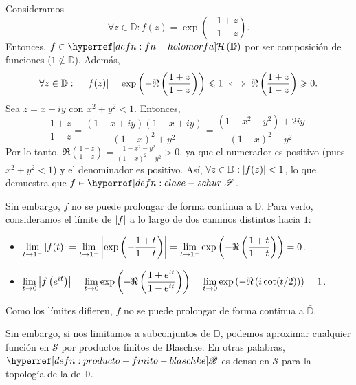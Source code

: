 \begin{ejem}
    Consideramos
    \[
    \forall z \in \mathbb{D} : f(z) = \exp \left(- \frac{1 + z}{1 - z} \right).
    \]
    Entonces, $f \in \exhyperref[defn:fn-holomorfa]{fn-holomorfa}{\mathcal{H}} \left(\mathbb{D}\right)$ por ser composición de funciones  ($1 \notin \mathbb{D}$). Además,
    \[
    \forall z \in \mathbb{D} : \quad \left|f(z)\right| = \exp \left( - \Re \left( \frac{1 + z}{1 - z} \right) \right) \leqslant 1 \iff \Re \left( \frac{1 + z}{1 - z} \right) \geqslant 0.
    \]
    Sea $z = x + iy$ con $x^2 + y^2 < 1$. Entonces,
    \[
    \frac{1 + z}{1 - z} = \frac{(1+x+iy)(1-x+iy)}{(1-x)^2 + y^2} = \frac{(1-x^2-y^2) + 2iy}{(1-x)^2 + y^2}.
    \]
    Por lo tanto, $\Re \left( \frac{1 + z}{1 - z} \right) = \frac{1 - x^2 - y^2}{(1-x)^2 + y^2} > 0$, ya que el numerador es positivo (pues $x^2 + y^2 < 1$) y el denominador es positivo. Así, $\forall z \in \mathbb{D} : \left|f(z)\right| < 1$, lo que demuestra que $f \in \exhyperref[defn:clase-schur]{clase-schur}{\mathscr{S}}$.

    Sin embargo, $f$ no se puede prolongar de forma continua a $\bar{\mathbb{D}}$. Para verlo, consideramos el límite de $\left|f\right|$ a lo largo de dos caminos distintos hacia $1$:
    \begin{itemize}
        \item $\displaystyle \lim_{t \to 1^-} \left|f(t)\right| = \lim_{t \to 1^-} \left|\exp \left( - \frac{1 + t}{1 - t} \right)\right| = \lim_{t \to 1^-} \exp \left( - \Re \left( \frac{1 + t}{1 - t} \right) \right) = 0$.
        \item $\displaystyle \lim_{t \to 0} \left|f \left(e^{it} \right)\right| = \lim_{t \to 0} \exp \left( - \Re \left( \frac{1 + e^{it}}{1 - e^{it}} \right) \right) = \lim_{t \to 0} \exp \left( - \Re \left( i \cot(t/2) \right) \right) = 1$.
    \end{itemize}
    Como los límites difieren, $f$ no se puede prolongar de forma continua a $\bar{\mathbb{D}}$.
\end{ejem}

Sin embargo, si nos limitamos a subconjuntos  de $\mathbb{D}$, podemos aproximar cualquier función en $\mathscr{S}$ por productos finitos de Blaschke. En otras palabras, $\exhyperref[defn:producto-finito-blaschke]{producto-finito-blaschke}{\mathscr{B}}$ es denso en $\mathscr{S}$ para la topología de la  de $\mathbb{D}$.

